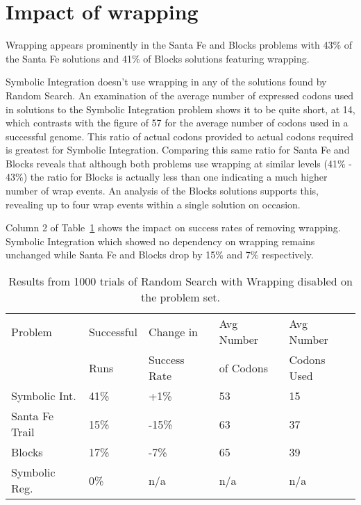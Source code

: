 \section{Impact of wrapping}
Wrapping appears prominently in the Santa Fe and Blocks problems with 43\% of the Santa Fe solutions and 41\% of Blocks solutions featuring wrapping.

 Symbolic Integration doesn't use wrapping in any of the solutions found by Random Search. An examination of the average number of expressed codons used in solutions to the Symbolic Integration problem shows it to be quite short, at 14, which contrasts with the figure of 57 for the average number of codons used in a successful genome. This ratio of actual codons provided to actual codons required is greatest for Symbolic Integration. Comparing this same ratio for Santa Fe and Blocks reveals that although both problems use wrapping at similar levels (41\% - 43\%) the ratio for Blocks is actually less than one indicating a much higher number of wrap events. An analysis of the Blocks solutions supports this, revealing up to four wrap events within a single solution on occasion. 

Column 2 of Table~\ref{rs_no_wrap_results_table} shows the impact on success rates of removing wrapping. Symbolic Integration which showed no dependency on wrapping remains unchanged while Santa Fe and Blocks drop by 15\% and 7\% respectively. 
 

\begin{table}[h]
\begin{center}
\begin{tabular}{|l|l|l|l|l|}
\hline
Problem & Successful & Change in  & Avg Number & Avg Number \\
        & Runs       & Success Rate & of Codons & Codons Used \\
\hline
Symbolic Int. & 41\% & +1\% & 53 & 15 \\
Santa Fe Trail & 15\% & -15\% & 63 & 37 \\
Blocks & 17\% & -7\% & 65 & 39 \\
Symbolic Reg. & 0\% & n/a & n/a & n/a \\
\hline
\end{tabular}
\caption{\label{rs_no_wrap_results_table} Results from 1000 trials of Random Search with Wrapping disabled on the problem set.}
\end{center}
\end{table}


